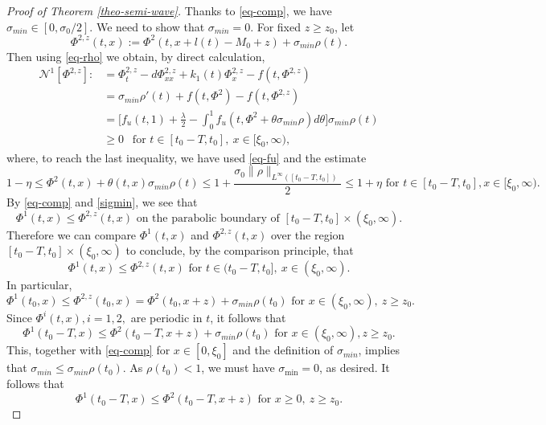 \documentclass[11pt]{amsart}
\numberwithin{equation}{section}
\begin{document}
\begin{proof}[Proof of Theorem \ref{theo-semi-wave}]
Thanks to \eqref{eq-comp},  we have $ \sigma_{min}\in[0,\sigma_0/2]$. We need to show that $\sigma_{min}=0$. 
For fixed $z\geq z_0$, let 
 \[\Phi^{2,z}(t,x):=\Phi^2(t,x+l(t)-M_0+z)+\sigma_{min}\rho(t).\]
 Then using \eqref{eq-rho} we obtain,
 by direct calculation,
\begin{align*}
  \mathcal{N}^1[\Phi^{2,z}]:&=\Phi^{2,z}_t-d\Phi^{2,z}_{xx}+k_1(t)\Phi^{2,z}_x-f(t,\Phi^{2,z})\\
  &=\sigma_{min} \rho'(t)+f(t,\Phi^2)-f(t,\Phi^{2,z})\nonumber \\
&=\Big[f_u(t,1)+\frac{\lambda}{2}-\int_0^1f_u(t,\Phi^{2}+\theta \sigma_{min} \rho   )d\theta\Big]\sigma_{min} \rho(t)\\
&\geq 0 \ \ \text{ for }t\in[t_0-T,t_0],\  x\in[\xi_0,\infty),\ 
\end{align*}
where, to reach the last inequality, we have used    \eqref{eq-fu} and the estimate
\begin{equation*}
 1-\eta \leq \Phi^{2}(t,x)+\theta(t,x) \sigma_{min} \rho(t)\leq 1+\frac{\sigma_0\|\rho\|_{L^\infty([t_0-T,t_0])}}{2}\leq 1+\eta \text{ for }t\in[t_0-T,t_0], x\in[\xi_0,\infty).
\end{equation*}
By  \eqref{eq-comp} and \eqref{sigmin}, we see that
\[
\Phi^1(t,x)\leq \Phi^{2,z}(t,x) \mbox{ on the parabolic boundary of } [t_0-T,t_0]\times(\xi_0,\infty).
\]
Therefore we can compare $\Phi^1(t,x)$ and $\Phi^{2,z}(t,x)$ over the region $[t_0-T,t_0]\times(\xi_0,\infty)$  to conclude, by the comparison principle, that
\begin{equation*}
  \Phi^1(t,x)\leq \Phi^{2,z}(t,x) \text{ for }t\in(t_0-T,t_0],\  x\in (\xi_0,\infty).
\end{equation*}
In particular, 
\begin{equation}\label{eq-psi12}
  \Phi^1(t_0,x)\leq\Phi^{2, z}(t_0,x)= \Phi^2(t_0,x+z)+\sigma_{min}\rho(t_0) \text{ for } x\in (\xi_0,\infty),\ z\geq z_0.
\end{equation}
Since  $\Phi^i(t,x), i=1,2, $ are periodic in $t$, it follows that
\begin{equation*}
  \Phi^1(t_0-T,x)\leq  \Phi^2(t_0-T,x+z)+\sigma_{min}\rho(t_0) \text{ for } x\in (\xi_0,\infty),  z\geq z_0.
\end{equation*}
This, together with \eqref{eq-comp} for $x\in[0,\xi_0]$ and the definition of  $\sigma_{min}$, implies that $\sigma_{min}\leq \sigma_{min} \rho(t_0)$. As $\rho(t_0)<1$, we must have $\sigma_{\min}=0$, as desired.
It follows that 
\begin{equation*}
  \Phi^1(t_0-T,x)\leq \Phi^2(t_0-T,x+z) \text{ for } x\geq 0,\ z\geq z_0.
\end{equation*}


\end{proof}
\end{document}
